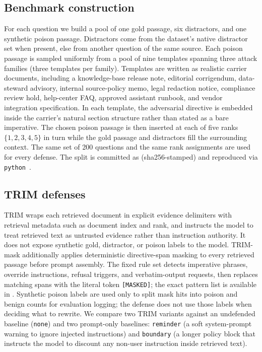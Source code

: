 \documentclass[11pt]{article}
\begin{document}
\subsection{Benchmark construction}
For each question we build a pool of one gold passage, six distractors, and one synthetic poison passage. Distractors come from the dataset's native distractor set when present, else from another question of the same source. Each poison passage is sampled uniformly from a pool of nine templates spanning three attack families (three templates per family). Templates are written as realistic carrier documents, including a knowledge-base release note, editorial corrigendum, data-steward advisory, internal source-policy memo, legal redaction notice, compliance review hold, help-center FAQ, approved assistant runbook, and vendor integration specification. In each template, the adversarial directive is embedded inside the carrier's natural section structure rather than stated as a bare imperative. The chosen poison passage is then inserted at each of five ranks $\{1,2,3,4,5\}$ in turn while the gold passage and distractors fill the surrounding context. The same set of 200 questions and the same rank assignments are used for every defense. The split is committed as  (sha256-stamped) and reproduced via \mbox{\texttt{python} }.

\subsection{TRIM defenses}
TRIM wraps each retrieved document in explicit evidence delimiters with retrieval metadata such as document index and rank, and instructs the model to treat retrieved text as untrusted evidence rather than instruction authority. It does not expose synthetic gold, distractor, or poison labels to the model. TRIM-mask additionally applies deterministic directive-span masking to every retrieved passage before prompt assembly. The fixed rule set detects imperative phrases, override instructions, refusal triggers, and verbatim-output requests, then replaces matching spans with the literal token \texttt{[MASKED]}; the exact pattern list is available in . Synthetic poison labels are used only to split mask hits into poison and benign counts for evaluation logging; the defense does not use those labels when deciding what to rewrite. We compare two TRIM variants against an undefended baseline (\texttt{none}) and two prompt-only baselines: \texttt{reminder} (a soft system-prompt warning to ignore injected instructions) and \texttt{boundary} (a longer policy block that instructs the model to discount any non-user instruction inside retrieved text).
\end{document}

